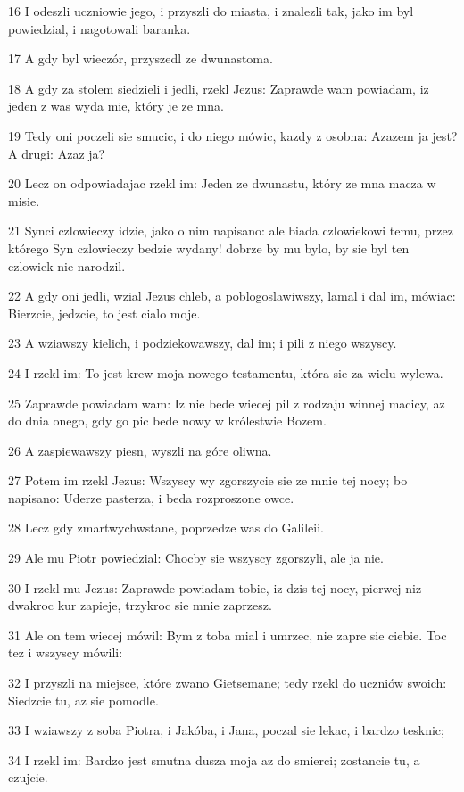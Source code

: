 \par 16 I odeszli uczniowie jego, i przyszli do miasta, i znalezli tak, jako im byl powiedzial, i nagotowali baranka.
\par 17 A gdy byl wieczór, przyszedl ze dwunastoma.
\par 18 A gdy za stolem siedzieli i jedli, rzekl Jezus: Zaprawde wam powiadam, iz jeden z was wyda mie, który je ze mna.
\par 19 Tedy oni poczeli sie smucic, i do niego mówic, kazdy z osobna: Azazem ja jest? A drugi: Azaz ja?
\par 20 Lecz on odpowiadajac rzekl im: Jeden ze dwunastu, który ze mna macza w misie.
\par 21 Synci czlowieczy idzie, jako o nim napisano: ale biada czlowiekowi temu, przez którego Syn czlowieczy bedzie wydany! dobrze by mu bylo, by sie byl ten czlowiek nie narodzil.
\par 22 A gdy oni jedli, wzial Jezus chleb, a poblogoslawiwszy, lamal i dal im, mówiac: Bierzcie, jedzcie, to jest cialo moje.
\par 23 A wziawszy kielich, i podziekowawszy, dal im; i pili z niego wszyscy.
\par 24 I rzekl im: To jest krew moja nowego testamentu, która sie za wielu wylewa.
\par 25 Zaprawde powiadam wam: Iz nie bede wiecej pil z rodzaju winnej macicy, az do dnia onego, gdy go pic bede nowy w królestwie Bozem.
\par 26 A zaspiewawszy piesn, wyszli na góre oliwna.
\par 27 Potem im rzekl Jezus: Wszyscy wy zgorszycie sie ze mnie tej nocy; bo napisano: Uderze pasterza, i beda rozproszone owce.
\par 28 Lecz gdy zmartwychwstane, poprzedze was do Galileii.
\par 29 Ale mu Piotr powiedzial: Chocby sie wszyscy zgorszyli, ale ja nie.
\par 30 I rzekl mu Jezus: Zaprawde powiadam tobie, iz dzis tej nocy, pierwej niz dwakroc kur zapieje, trzykroc sie mnie zaprzesz.
\par 31 Ale on tem wiecej mówil: Bym z toba mial i umrzec, nie zapre sie ciebie. Toc tez i wszyscy mówili:
\par 32 I przyszli na miejsce, które zwano Gietsemane; tedy rzekl do uczniów swoich: Siedzcie tu, az sie pomodle.
\par 33 I wziawszy z soba Piotra, i Jakóba, i Jana, poczal sie lekac, i bardzo tesknic;
\par 34 I rzekl im: Bardzo jest smutna dusza moja az do smierci; zostancie tu, a czujcie.
